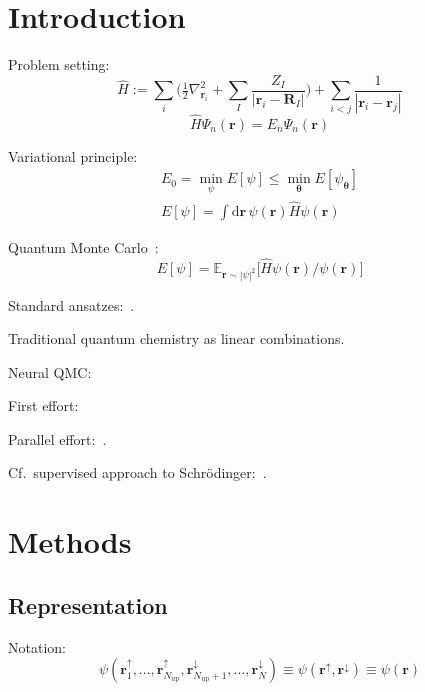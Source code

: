 
\section{Introduction}

Problem setting:
\begin{equation}
\hat H
  :=\sum_i\bigg(
    \tfrac12\nabla_{\mathbf r_i}^2
    +\sum_I\frac{Z_I}{|\mathbf r_i-\mathbf R_I|}
  \bigg)
  +\sum_{i<j}\frac1{|\mathbf r_i-\mathbf r_j|}
\end{equation}
\begin{equation}
\hat H\Psi_n(\mathbf r)=E_n\Psi_n(\mathbf r)
\end{equation}

Variational principle:
\begin{gather}
E_0=\min_\psi E[\psi]\leq\min_{\boldsymbol\theta}E[\psi_{\boldsymbol\theta}] \\
E[\psi]=\int\mathrm d\mathbf r\,\psi(\mathbf r)\hat H\psi(\mathbf r)
\end{gather}

Quantum Monte Carlo~\citep{FoulkesRMP01,NeedsJPCM10,AustinCR12}:
\begin{equation}
E[\psi]
  =\mathbb E_{\mathbf r\sim|\psi|^2}
  \big[\hat H\psi(\mathbf r)/\psi(\mathbf r)\big]
\end{equation}

Standard ansatzes:~\cite{DrummondPRB04}.

Traditional quantum chemistry as linear combinations.

Neural QMC:~\cite{CarleoS17}

First effort:~\cite{HanA18}

Parallel effort:~\cite{PfauA19}.

Cf.\ supervised approach to Schrödinger:~\cite{MillsPR17}.

\section{Methods}

\subsection{Representation}

Notation:
\begin{equation}
\psi(
  \mathbf r_1^\uparrow,\ldots,\mathbf r_{N_\mathrm{up}}^\uparrow,
  \mathbf r_{N_\mathrm{up}+1}^\downarrow,\ldots,\mathbf r_N^\downarrow
  )
  \equiv\psi(\mathbf r^\uparrow,\mathbf r^\downarrow)\equiv\psi(\mathbf r)
\end{equation}

